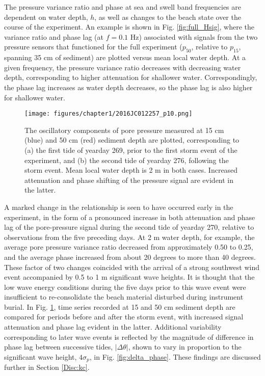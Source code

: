 The pressure variance ratio and phase at sea and swell band frequencies are dependent on water depth, $h$, as well as changes to the beach state over the course of the experiment. An example is shown in Fig. \ref{fig:full_Hsig}, where the variance ratio and phase lag (at $f=0.1$ Hz) associated with signals from the two pressure sensors that functioned for the full experiment ($p_{50}$, relative to $p_{15}$, spanning 35 cm of sediment) are plotted versus mean local water depth. At a given frequency, the pressure variance ratio decreases with decreasing water depth, corresponding to higher attenuation for shallower water. Correspondingly, the phase lag increases as water depth decreases, so the phase lag is also higher for shallower water.

\begin{figure} %
		\noindent\texttt{[image: figures/chapter1/2016JC012257\_p10.png]}
	\caption[Sample pore pressure time series pre- and post-storm]{The oscillatory components of pore pressure measured at 15 cm (blue) and 50 cm (red) sediment depth are plotted, corresponding to (a) the first tide of yearday 269, prior to the first storm event of the experiment, and (b) the second tide of yearday 276, following the storm event. Mean local water depth is 2 m in both cases. Increased attenuation and phase shifting of the pressure signal are evident in the latter.}
	\label{fig:ts_pre_post}
\end{figure}

A marked change in the relationship is seen to have occurred early in the experiment, in the form of a pronounced increase in both attenuation and phase lag of the pore-pressure signal during the second tide of yearday 270, relative to observations from the five preceding days. At 2 m water depth, for example, the average pore pressure variance ratio decreased from approximately 0.50 to 0.25, and the average phase increased from about 20 degrees to more than 40 degrees. These factor of two changes coincided with the arrival of a strong southwest wind event accompanied by 0.5 to 1 m significant wave heights. It is thought that the low wave energy conditions during the five days prior to this wave event were insufficient to re-consolidate the beach material disturbed during instrument burial. In Fig. \ref{fig:ts_pre_post}, time series recorded at 15 and 50 cm sediment depth are compared for periods before and after the storm event, with increased signal attenuation and phase lag evident in the latter. Additional variability corresponding to later wave events is reflected by the magnitude of difference in phase lag between successive tides, $|\Delta\theta|$, shown to vary in proportion to the significant wave height, $4\sigma_{p}$, in Fig. \ref{fig:delta_phase}. These findings are discussed further in Section \ref{Disc:kc}.

